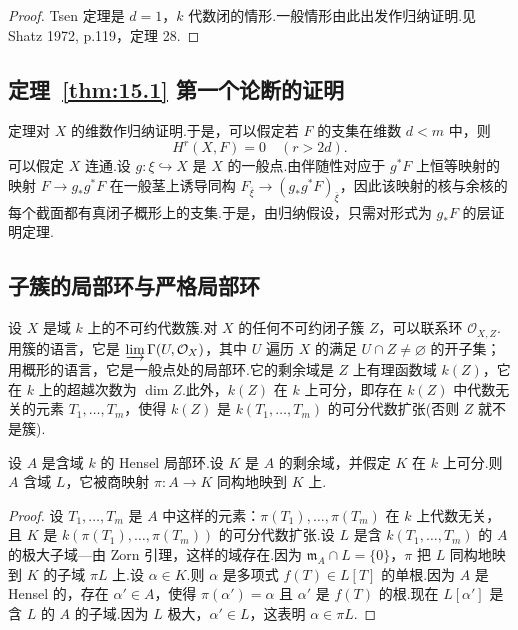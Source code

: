 \begin{proof}
Tsen 定理是 $d = 1$，$k$ 代数闭的情形.一般情形由此出发作归纳证明.见 Shatz 1972, p.119，定理 28.
\end{proof}

\subsection*{定理~\ref{thm:15.1} 第一个论断的证明}

定理对 $X$ 的维数作归纳证明.于是，可以假定若 $F$ 的支集在维数 $d < m$ 中，则
\[
H^{r}(X, F) = 0 \quad (r > 2d).
\]
可以假定 $X$ 连通.设 $g \colon \xi \hookrightarrow X$ 是 $X$ 的一般点.由伴随性对应于 $g^{*}F$ 上恒等映射的映射 $F \to g_{*}g^{*}F$ 在一般茎上诱导同构 $F_{\bar{\xi}} \to (g_{*}g^{*}F)_{\bar{\xi}}$，因此该映射的核与余核的每个截面都有真闭子概形上的支集.于是，由归纳假设，只需对形式为 $g_{*}F$ 的层证明定理.

\subsection*{子簇的局部环与严格局部环}

设 $X$ 是域 $k$ 上的不可约代数簇.对 $X$ 的任何不可约闭子簇 $Z$，可以联系环 $\mathcal{O}_{X, Z}$.用簇的语言，它是 $\varinjlim \Gamma(U, \mathcal{O}_X)$，其中 $U$ 遍历 $X$ 的满足 $U \cap Z \neq \varnothing$ 的开子集；用概形的语言，它是一般点处的局部环.它的剩余域是 $Z$ 上有理函数域 $k(Z)$，它在 $k$ 上的超越次数为 $\dim Z$.此外，$k(Z)$ 在 $k$ 上可分，即存在 $k(Z)$ 中代数无关的元素 $T_1, \ldots, T_m$，使得 $k(Z)$ 是 $k(T_1, \ldots, T_m)$ 的可分代数扩张(否则 $Z$ 就不是簇).

\begin{lemma}\label{lem:15.3}
设 $A$ 是含域 $k$ 的 Hensel 局部环.设 $K$ 是 $A$ 的剩余域，并假定 $K$ 在 $k$ 上可分.则 $A$ 含域 $L$，它被商映射 $\pi \colon A \to K$ 同构地映到 $K$ 上.
\end{lemma}

\begin{proof}
设 $T_1, \ldots, T_m$ 是 $A$ 中这样的元素：$\pi(T_1), \ldots, \pi(T_m)$ 在 $k$ 上代数无关，且 $K$ 是 $k(\pi(T_1), \ldots, \pi(T_m))$ 的可分代数扩张.设 $L$ 是含 $k(T_1, \ldots, T_m)$ 的 $A$ 的极大子域---由 Zorn 引理，这样的域存在.因为 $\mathfrak{m}_{A} \cap L = \{0\}$，$\pi$ 把 $L$ 同构地映到 $K$ 的子域 $\pi L$ 上.设 $\alpha \in K$.则 $\alpha$ 是多项式 $f(T) \in L[T]$ 的单根.因为 $A$ 是 Hensel 的，存在 $\alpha' \in A$，使得 $\pi(\alpha') = \alpha$ 且 $\alpha'$ 是 $f(T)$ 的根.现在 $L[\alpha']$ 是含 $L$ 的 $A$ 的子域.因为 $L$ 极大，$\alpha' \in L$，这表明 $\alpha \in \pi L$.
\end{proof}


